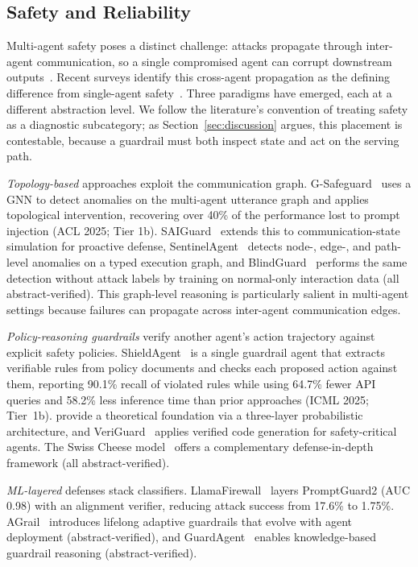 \subsection{Safety and Reliability}\label{sec:diag_safety}

Multi-agent safety poses a distinct challenge: attacks propagate through inter-agent communication, so a single compromised agent can corrupt downstream outputs~\cite{safellmagentsurvey2026, trustworthyagents2025}. Recent surveys identify this cross-agent propagation as the defining difference from single-agent safety~\cite{fullstacksafety2025}. Three paradigms have emerged, each at a different abstraction level. We follow the literature's convention of treating safety as a diagnostic subcategory; as Section~\ref{sec:discussion} argues, this placement is contestable, because a guardrail must both inspect state and act on the serving path.

\emph{Topology-based} approaches exploit the communication graph. G-Safeguard~\cite{gsafeguard2025} uses a GNN to detect anomalies on the multi-agent utterance graph and applies topological intervention, recovering over 40\% of the performance lost to prompt injection (ACL 2025; Tier 1b). SAIGuard~\cite{saiguard2026} extends this to communication-state simulation for proactive defense, SentinelAgent~\cite{sentinelagent2025} detects node-, edge-, and path-level anomalies on a typed execution graph, and BlindGuard~\cite{blindguard2025} performs the same detection without attack labels by training on normal-only interaction data (all abstract-verified). This graph-level reasoning is particularly salient in multi-agent settings because failures can propagate across inter-agent communication edges.

\emph{Policy-reasoning guardrails} verify another agent's action trajectory against explicit safety policies. ShieldAgent~\cite{shieldagent2025} is a single guardrail agent that extracts verifiable rules from policy documents and checks each proposed action against them, reporting 90.1\% recall of violated rules while using 64.7\% fewer API queries and 58.2\% less inference time than prior approaches (ICML 2025; Tier~1b). \cite{probabilisticarchitecture2026} provide a theoretical foundation via a three-layer probabilistic architecture, and VeriGuard~\cite{veriguard2025} applies verified code generation for safety-critical agents. The Swiss Cheese model~\cite{swisscheese2025} offers a complementary defense-in-depth framework (all abstract-verified).

\emph{ML-layered} defenses stack classifiers. LlamaFirewall~\cite{llamafirewall2025} layers PromptGuard2 (AUC 0.98) with an alignment verifier, reducing attack success from 17.6\% to 1.75\%. AGrail~\cite{agrail2025} introduces lifelong adaptive guardrails that evolve with agent deployment (abstract-verified), and GuardAgent~\cite{guardagent2024} enables knowledge-based guardrail reasoning (abstract-verified).

